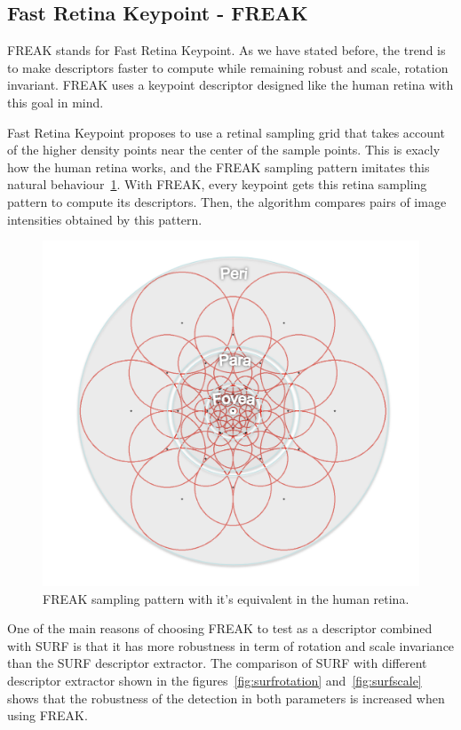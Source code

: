\subsection{Fast Retina Keypoint - FREAK}
FREAK stands for Fast Retina Keypoint\cite{Ortiz:2012:FFR:2354409.2354903}. As we
have stated before, the trend is to make descriptors faster to compute while
remaining robust and scale, rotation invariant. FREAK uses a keypoint descriptor
designed like the human retina with this goal in mind.

Fast Retina Keypoint proposes to use a retinal sampling grid that takes account of
the higher density points near the center of the sample points. This is exacly how
the human retina works, and the FREAK sampling pattern imitates this natural
behaviour~\ref{fig:freak}. With FREAK, every keypoint gets this retina sampling
pattern to compute its descriptors. Then, the algorithm compares pairs of image
intensities obtained by this pattern.

\begin{figure}
\centering
\includegraphics[scale=0.55]{img/freak.png}
\caption{\label{fig:freak}FREAK sampling pattern with it's equivalent in the human
  retina.} 
\end{figure} 

One of the main reasons of choosing FREAK to test as a descriptor combined with
SURF is that it has more robustness in term of rotation and scale
invariance than the SURF descriptor extractor. The
comparison of SURF with different descriptor 
extractor\cite{rotationscaleinv} shown in the figures~\ref{fig:surfrotation}
and~\ref{fig:surfscale}
shows that the robustness of the detection in both parameters is increased when
using FREAK. 

